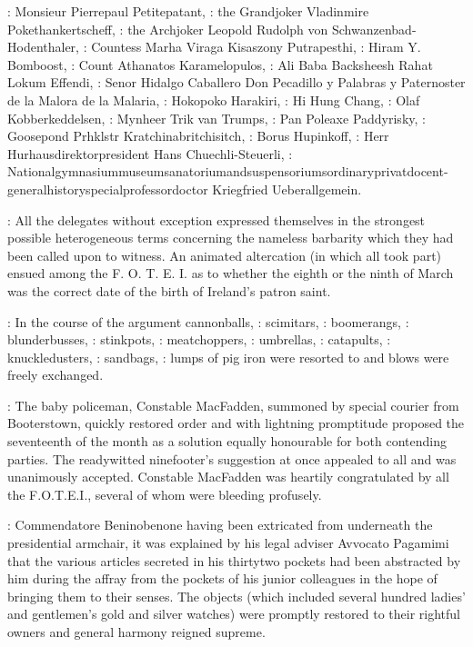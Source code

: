 :
Monsieur Pierrepaul Petitepatant,
:
the Grandjoker Vladinmire Pokethankertscheff,
:
the Archjoker Leopold Rudolph von Schwanzenbad-Hodenthaler,
:
Countess Marha Viraga Kisaszony Putrapesthi,
:
Hiram Y. Bomboost,
:
Count Athanatos Karamelopulos,
:
Ali Baba Backsheesh Rahat Lokum Effendi, 
:
Senor Hidalgo Caballero Don Pecadillo y Palabras y Paternoster de la Malora de la Malaria, 
:
Hokopoko Harakiri, 
:
Hi Hung Chang, 
:
Olaf Kobberkeddelsen, 
:
Mynheer Trik van Trumps, 
:
Pan Poleaxe Paddyrisky, 
:
Goosepond Prhklstr Kratchinabritchisitch, 
:
Borus Hupinkoff, 
:
Herr Hurhausdirektorpresident Hans Chuechli-Steuerli, 
:
Nationalgymnasiummuseumsanatoriumandsuspensoriumsordinaryprivatdocent-
generalhistoryspecialprofessordoctor Kriegfried Ueberallgemein.

:
All the delegates without exception expressed themselves
in the strongest possible heterogeneous terms concerning the nameless
barbarity which they had been called upon to witness. An animated
altercation (in which all took part) ensued among the F. O. T. E. I.
as to whether the eighth or the ninth of March was the correct
date of the birth of Ireland's patron saint.

:
In the course of the argument cannonballs,
:
scimitars,
:
boomerangs, 
:
blunderbusses, 
:
stinkpots, 
:
meatchoppers, 
:
umbrellas, 
:
catapults, 
:
knuckledusters, 
:
sandbags, 
:
lumps of pig iron were resorted to and blows were freely exchanged.

:
The baby policeman, Constable MacFadden, summoned by special courier from
Booterstown, quickly restored order and with lightning promptitude
proposed the seventeenth of the month as a solution equally honourable for
both contending parties. The readywitted ninefooter's suggestion at once
appealed to all and was unanimously accepted. Constable MacFadden was
heartily congratulated by all the F.O.T.E.I., several of whom were
bleeding profusely.

:
Commendatore Beninobenone having been extricated
from underneath the presidential armchair, it was explained by his legal
adviser Avvocato Pagamimi that the various articles secreted in his
thirtytwo pockets had been abstracted by him during the affray from the
pockets of his junior colleagues in the hope of bringing them to their
senses. The objects (which included several hundred ladies' and
gentlemen's gold and silver watches) were promptly restored to their
rightful owners and general harmony reigned supreme.

